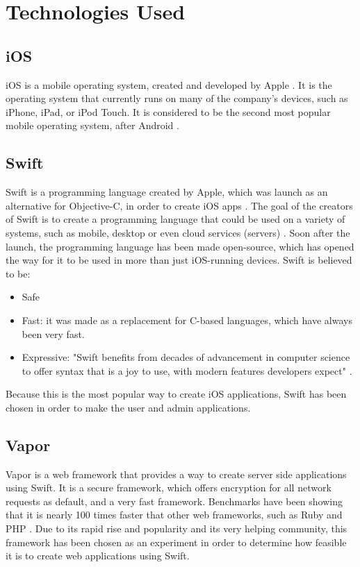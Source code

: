 \section{Technologies Used}
\subsection{iOS}
iOS is a mobile operating system, created and developed by Apple \cite{iOS}. It is the operating system that currently runs on many of the company's devices, such as iPhone, iPad, or iPod Touch. It is considered to be the second most popular mobile operating system, after Android \cite{iOS}.

\subsection{Swift}
Swift is a programming language created by Apple, which was launch as an alternative for Objective-C, in order to create iOS apps \cite{swift}. The goal of the creators of Swift is to create a programming language that could be used on a variety of systems, such as mobile, desktop or even cloud services (servers) \cite{swift}. Soon after the launch, the programming language has been made open-source, which has opened the way for it to be used in more than just iOS-running devices. Swift is believed to be:
\begin{itemize}
    \item Safe
    \item Fast: it was made as a replacement for C-based languages, which have always been very fast.
    \item Expressive: "Swift benefits from decades of advancement in computer science to offer syntax that is a joy to use, with modern features developers expect" \cite{swift}.
\end{itemize}

Because this is the most popular way to create iOS applications, Swift has been chosen in order to make the user and admin applications.

\subsection{Vapor}
Vapor is a web framework that provides a way to create server side applications using Swift. It is a secure framework, which offers encryption for all network requests as default, and a very fast framework. Benchmarks have been showing that it is nearly 100 times faster that other web frameworks, such as Ruby and PHP \cite{vapor}. Due to its rapid rise and popularity and its very helping community, this framework has been chosen as an experiment in order to determine how feasible it is to create web applications using Swift.

